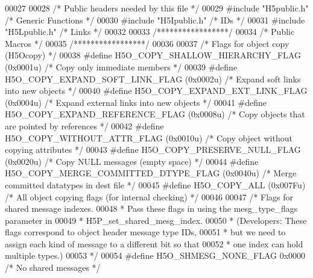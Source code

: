 \begin{DoxyCode}
00027 
00028 \textcolor{comment}{/* Public headers needed by this file */}
00029 \textcolor{preprocessor}{#include "H5public.h"}       \textcolor{comment}{/* Generic Functions            */}
00030 \textcolor{preprocessor}{#include "H5Ipublic.h"}      \textcolor{comment}{/* IDs                  */}
00031 \textcolor{preprocessor}{#include "H5Lpublic.h"}      \textcolor{comment}{/* Links                */}
00032 
00033 \textcolor{comment}{/*****************/}
00034 \textcolor{comment}{/* Public Macros */}
00035 \textcolor{comment}{/*****************/}
00036 
00037 \textcolor{comment}{/* Flags for object copy (H5Ocopy) */}
00038 \textcolor{preprocessor}{#define H5O\_COPY\_SHALLOW\_HIERARCHY\_FLAG (0x0001u)   }\textcolor{comment}{/* Copy only immediate members */}\textcolor{preprocessor}{}
00039 \textcolor{preprocessor}{#define H5O\_COPY\_EXPAND\_SOFT\_LINK\_FLAG  (0x0002u)   }\textcolor{comment}{/* Expand soft links into new objects */}\textcolor{preprocessor}{}
00040 \textcolor{preprocessor}{#define H5O\_COPY\_EXPAND\_EXT\_LINK\_FLAG   (0x0004u)   }\textcolor{comment}{/* Expand external links into new objects */}\textcolor{preprocessor}{}
00041 \textcolor{preprocessor}{#define H5O\_COPY\_EXPAND\_REFERENCE\_FLAG  (0x0008u)   }\textcolor{comment}{/* Copy objects that are pointed by references */}\textcolor{preprocessor}{}
00042 \textcolor{preprocessor}{#define H5O\_COPY\_WITHOUT\_ATTR\_FLAG      (0x0010u)   }\textcolor{comment}{/* Copy object without copying attributes */}\textcolor{preprocessor}{}
00043 \textcolor{preprocessor}{#define H5O\_COPY\_PRESERVE\_NULL\_FLAG     (0x0020u)   }\textcolor{comment}{/* Copy NULL messages (empty space) */}\textcolor{preprocessor}{}
00044 \textcolor{preprocessor}{#define H5O\_COPY\_MERGE\_COMMITTED\_DTYPE\_FLAG (0x0040u)   }\textcolor{comment}{/* Merge committed datatypes in dest file */}\textcolor{preprocessor}{}
00045 \textcolor{preprocessor}{#define H5O\_COPY\_ALL                    (0x007Fu)   }\textcolor{comment}{/* All object copying flags (for internal checking) */}\textcolor{preprocessor}{}
00046 
00047 \textcolor{comment}{/* Flags for shared message indexes.}
00048 \textcolor{comment}{ * Pass these flags in using the mesg\_type\_flags parameter in}
00049 \textcolor{comment}{ * H5P\_set\_shared\_mesg\_index.}
00050 \textcolor{comment}{ * (Developers: These flags correspond to object header message type IDs,}
00051 \textcolor{comment}{ * but we need to assign each kind of message to a different bit so that}
00052 \textcolor{comment}{ * one index can hold multiple types.)}
00053 \textcolor{comment}{ */}
00054 \textcolor{preprocessor}{#define H5O\_SHMESG\_NONE\_FLAG    0x0000          }\textcolor{comment}{/* No shared messages */}\textcolor{preprocessor}{}

\end{DoxyCode}

